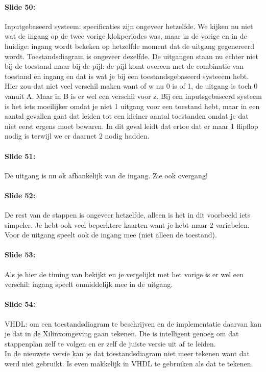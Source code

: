 \documentclass[10pt,a4paper]{book}
\begin{document}
\paragraph{Slide 50:} Inputgebaseerd systeem: specificaties zijn ongeveer hetzelfde. We kijken nu niet wat de ingang op de twee vorige klokperiodes was, maar in de vorige en in de huidige: ingang wordt bekeken op hetzelfde moment dat de uitgang gegenereerd wordt. Toestandsdiagram is ongeveer dezelfde. De uitgangen staan nu echter niet bij de toestand maar bij de pijl: de pijl komt overeen met de combinatie van toestand en ingang en dat is wat je bij een toestandsgebaseerd systeeem hebt. Hier zou dat niet veel verschil maken want of w nu 0 is of 1, de uitgang is toch 0 vanuit A. Maar in B is er wel een verschil voor z.
Bij een inputsgebaseerd systeem is het iets moeilijker omdat je niet 1 uitgang voor een toestand hebt, maar in een aantal gevallen gaat dat leiden tot een kleiner aantal toestanden omdat je dat niet eerst ergens moet bewaren.  In dit geval leidt dat ertoe dat er maar 1 flipflop nodig is terwijl we er daarnet 2 nodig hadden.

\paragraph{Slide 51:} De uitgang is nu ok afhankelijk van de ingang. Zie ook overgang! 

\paragraph{Slide 52:} De rest van de stappen is ongeveer hetzelfde, alleen is het in dit voorbeeld iets simpeler. Je hebt ook veel beperktere kaarten want je hebt maar 2 variabelen. Voor de uitgang speelt ook de ingang mee (niet alleen de toestand).

\paragraph{Slide 53:} Als je hier de timing van bekijkt en je vergelijkt met het vorige is er wel een verschil: ingang speelt onmiddelijk mee in de uitgang. 

\paragraph{Slide 54:} VHDL: om een toestandsdiagram te beschrijven en de implementatie daarvan kan je dat in de Xilinxomgeving gaan tekenen. Die is intelligent genoeg om dat stappenplan zelf te volgen en er zelf de juiste versie uit af te leiden.\\
In de nieuwste versie kan je dat toestandsdiagram niet meer tekenen want dat werd niet gebruikt. Is even makkelijk in VHDL te gebruiken als dat te tekenen.
\end{document}
